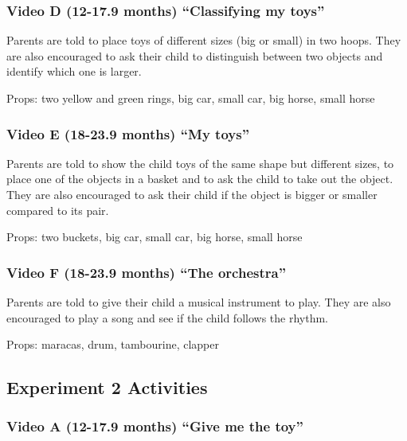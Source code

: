 \documentclass[man,floatsintext]{apa6}
\begin{document}
\begin{appendix}
\hypertarget{video-d-12-17.9-months-classifying-my-toys}{%
\subsubsection{Video D (12-17.9 months) ``Classifying my
toys''}\label{video-d-12-17.9-months-classifying-my-toys}}

Parents are told to place toys of different sizes (big or small) in two
hoops. They are also encouraged to ask their child to distinguish
between two objects and identify which one is larger.

Props: two yellow and green rings, big car, small car, big horse, small
horse

\hypertarget{video-e-18-23.9-months-my-toys}{%
\subsubsection{Video E (18-23.9 months) ``My
toys''}\label{video-e-18-23.9-months-my-toys}}

Parents are told to show the child toys of the same shape but different
sizes, to place one of the objects in a basket and to ask the child to
take out the object. They are also encouraged to ask their child if the
object is bigger or smaller compared to its pair.

Props: two buckets, big car, small car, big horse, small horse

\hypertarget{video-f-18-23.9-months-the-orchestra}{%
\subsubsection{Video F (18-23.9 months) ``The
orchestra''}\label{video-f-18-23.9-months-the-orchestra}}

Parents are told to give their child a musical instrument to play. They
are also encouraged to play a song and see if the child follows the
rhythm.

Props: maracas, drum, tambourine, clapper

\hypertarget{experiment-2-activities}{%
\subsection{Experiment 2 Activities}\label{experiment-2-activities}}

\hypertarget{video-a-12-17.9-months-give-me-the-toy}{%
\subsubsection{Video A (12-17.9 months) ``Give me the
toy''}\label{video-a-12-17.9-months-give-me-the-toy}}


\end{appendix}
\end{document}
